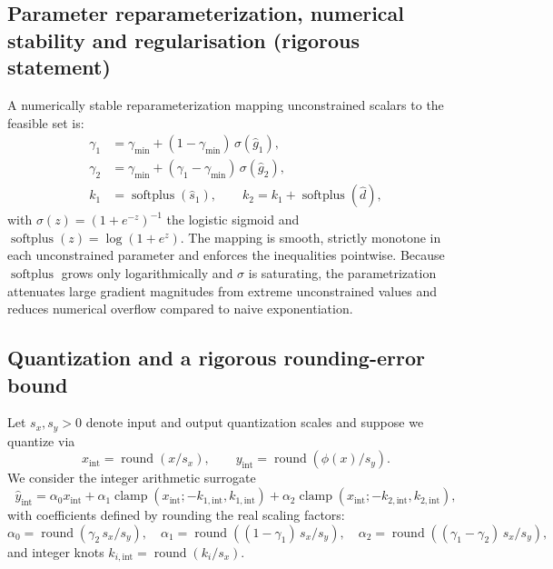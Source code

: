 \documentclass[11pt, twoside, openright, english]{article}
\DeclareMathOperator{\clamp}{clamp}
\newcommand{\softplus}{\operatorname{softplus}}
\numberwithin{equation}{section}
\theoremstyle{plain}
\theoremstyle{definition}
\theoremstyle{remark}
\begin{document}
\subsection{Parameter reparameterization, numerical stability and regularisation (rigorous statement)}
A numerically stable reparameterization mapping unconstrained scalars to the feasible set is:
\begin{align*}
\gamma_1 &= \gamma_{\min} + (1-\gamma_{\min})\,\sigma(\widehat g_1),\\[4pt]
\gamma_2 &= \gamma_{\min} + (\gamma_1-\gamma_{\min})\,\sigma(\widehat g_2),\\[4pt]
k_1 &= \softplus(\widehat s_1),\qquad k_2 = k_1 + \softplus(\widehat d),
\end{align*}
with $\sigma(z)=(1+e^{-z})^{-1}$ the logistic sigmoid and $\softplus(z)=\log(1+e^{z})$. The mapping is smooth, strictly monotone in each unconstrained parameter and enforces the inequalities pointwise. Because $\softplus$ grows only logarithmically and $\sigma$ is saturating, the parametrization attenuates large gradient magnitudes from extreme unconstrained values and reduces numerical overflow compared to naive exponentiation.

\subsection{Quantization and a rigorous rounding-error bound}
Let $s_x,s_y>0$ denote input and output quantization scales and suppose we quantize via
\[
x_{\mathrm{int}}=\operatorname{round}(x/s_x),\qquad y_{\mathrm{int}}=\operatorname{round}(\phi(x)/s_y).
\]
We consider the integer arithmetic surrogate
\[
\widehat y_{\mathrm{int}} = \alpha_0 x_{\mathrm{int}} + \alpha_1 \clamp(x_{\mathrm{int}};-k_{1,\mathrm{int}},k_{1,\mathrm{int}}) + \alpha_2 \clamp(x_{\mathrm{int}};-k_{2,\mathrm{int}},k_{2,\mathrm{int}}),
\]
with coefficients defined by rounding the real scaling factors:
\[
\alpha_0 = \operatorname{round}(\gamma_2\,s_x/s_y),\quad
\alpha_1 = \operatorname{round}((1-\gamma_1)\,s_x/s_y),\quad
\alpha_2 = \operatorname{round}((\gamma_1-\gamma_2)\,s_x/s_y),
\]
and integer knots $k_{i,\mathrm{int}}=\operatorname{round}(k_i/s_x)$.
\end{document}
